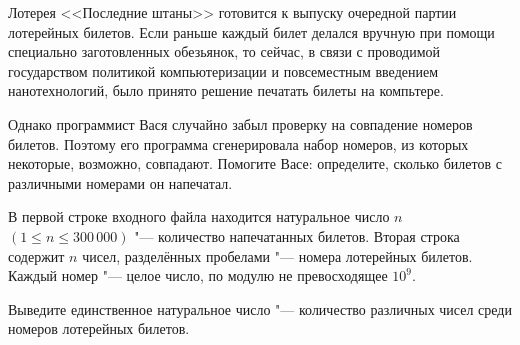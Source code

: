 Лотерея <<Последние штаны>> готовится к выпуску очередной партии 
лотерейных билетов. Если раньше каждый билет делался вручную при помощи
специально заготовленных обезьянок, то сейчас, в связи с проводимой
государством политикой компьютеризации и повсеместным введением
нанотехнологий, было принято решение печатать билеты на компьтере.

Однако программист Вася случайно забыл проверку на совпадение номеров
билетов. Поэтому его программа сгенерировала набор номеров, из которых
некоторые, возможно, совпадают. Помогите Васе: определите, сколько 
билетов с различными номерами он напечатал.

\InputFile

В первой строке входного файла находится натуральное число 
$n$ $(1 \leq n \leq 300\,000)$ "--- количество напечатанных билетов.
Вторая строка содержит $n$ чисел, разделённых пробелами "--- номера 
лотерейных билетов.
Каждый номер "--- целое число, по модулю не превосходящее $10^9$.

\OutputFile

Выведите единственное натуральное число "--- количество различных чисел 
среди номеров лотерейных билетов.
